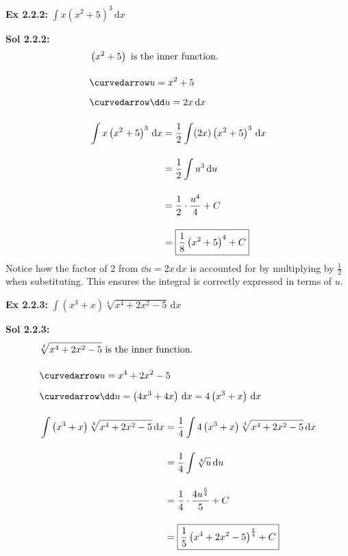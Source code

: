 \begin{tcolorbox}[example]
    \textbf{Ex 2.2.2: } $\int x\left(x^2 + 5\right)^3 \,\mathrm{d}x$
\end{tcolorbox}
\begin{tcolorbox}[solution]
    \textbf{Sol 2.2.2: } \begin{align*}
        & \left(x^2 + 5\right) \text{ is the inner function.} \\[11pt]
        & \curvedarrow u = x^2 + 5 \\[5.5pt]
        & \curvedarrow \dd u = 2x \,\mathrm{d}x \\[11pt]
        & \int x\left(x^2 + 5\right)^3 \,\mathrm{d}x \begin{aligned}[t]
            & = \dfrac{1}{2}\int (2x)\left(x^2 + 5\right)^3 \,\mathrm{d}x \\[11pt]
            & = \dfrac{1}{2}\int u^3 \,\mathrm{d}u \\[11pt]
            & = \dfrac{1}{2} \cdot \dfrac{u^4}{4} + C \\[11pt]
            & = \boxed{\dfrac{1}{8}\left(x^2 + 5\right)^4 + C}
        \end{aligned}
    \end{align*}
    Notice how the factor of $2$ from $\dd u = 2x\,\mathrm{d}x$ is accounted for by multiplying by $\frac{1}{2}$ when substituting. This ensures the integral is correctly expressed in terms of $u$.
\end{tcolorbox} \vspace{11pt}

\begin{tcolorbox}[example]
    \textbf{Ex 2.2.3: } $\int \left(x^3 + x\right)\sqrt[4]{x^4 + 2x^2 - 5} \,\mathrm{d}x$
\end{tcolorbox}
\begin{tcolorbox}[solution]
    \textbf{Sol 2.2.3: } \begin{align*}
        & \sqrt[4]{x^4 + 2x^2 - 5} \text{ is the inner function.} \\[11pt]
        & \curvedarrow u = x^4 + 2x^2 - 5 \\[5.5pt]
        & \curvedarrow \dd u = \left(4x^3 + 4x\right)\,\mathrm{d}x = 4\left(x^3 + x\right) \,\mathrm{d}x \\[11pt]
        & \int \left(x^3 + x\right)\sqrt[4]{x^4 + 2x^2 - 5} \,\mathrm{d}x \begin{aligned}[t]
            & = \dfrac{1}{4}\int 4\left(x^3 + x\right)\sqrt[4]{x^4 + 2x^2 - 5} \,\mathrm{d}x \\[11pt]
            & = \dfrac{1}{4}\int \sqrt[4]{u} \,\mathrm{d}u \\[11pt]
            & = \dfrac{1}{4} \cdot \dfrac{4u^{\frac{5}{4}}}{5} + C \\[11pt]
            & = \boxed{\dfrac{1}{5}\left(x^4 + 2x^2 - 5\right)^{\frac{5}{4}} + C}
        \end{aligned}
    \end{align*}
\end{tcolorbox} \vspace{11pt}

